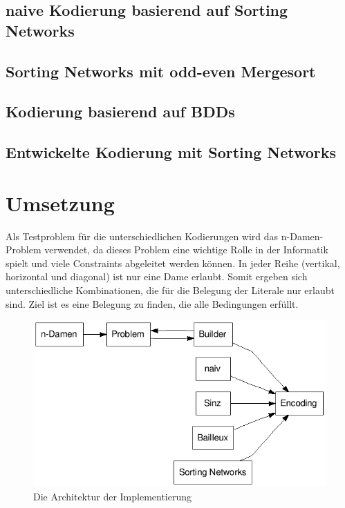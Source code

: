 \documentclass[a4,abstract=on]{scrartcl}
\newcommand*\stdsection{}
\let\stdsection\section
\renewcommand*\section{%
    \clearpage\ifodd\value{page}\else\mbox{}\clearpage\fi
    \stdsection}
\begin{document}
	\subsection{naive Kodierung basierend auf Sorting Networks}
	\subsection{Sorting Networks mit odd-even Mergesort}
	\subsection{Kodierung basierend auf BDDs}

	\subsection{Entwickelte Kodierung mit Sorting Networks}

\section{Umsetzung}
 Als Testproblem für die unterschiedlichen Kodierungen wird das n-Damen-Problem verwendet, da dieses Problem eine wichtige Rolle in der Informatik spielt und viele Constraints abgeleitet werden können. In jeder Reihe (vertikal, horizontal und diagonal) ist nur eine Dame erlaubt. Somit ergeben sich unterschiedliche Kombinationen, die für die Belegung der Literale nur erlaubt sind. Ziel ist es eine Belegung zu finden, die alle Bedingungen erfüllt. 

\begin{figure}[H]
\centering
\includegraphics[width=\textwidth]{architektur.png}
\caption{Die Architektur der Implementierung}
\label{fig:architektur}
\end{figure}
\end{document}
